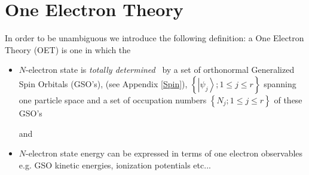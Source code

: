 \documentclass[aps,preprint]{revtex4}%
\begin{document}
\section{One Electron Theory\label{OET}}

In order to be unambiguous we introduce the following definition: a One
Electron Theory (OET) is one in which the

\begin{itemize}
\item $N$-electron state is \emph{totally determined} \ by a set of
orthonormal Generalized Spin Orbitals (GSO's), (see Appendix \ref{Spin}),
$\left\{  \left\vert \psi_{j}\right\rangle ;1\leq j\leq r\right\}  $ spanning
one particle space and a set of occupation numbers $\left\{  N_{j};1\leq j\leq
r\right\}  $ of these GSO's

and

\item $N$-electron state energy can be expressed in terms of one electron
observables e.g. GSO kinetic energies, ionization potentials etc...
\end{itemize}
\end{document}

